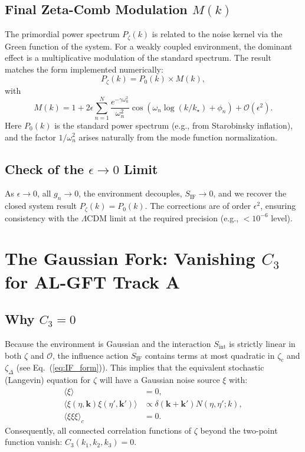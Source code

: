 \documentclass[12pt]{article}
\begin{document}
\subsection{Final Zeta-Comb Modulation $M(k)$}
The primordial power spectrum $P_\zeta(k)$ is related to the noise kernel via the Green function of the system. For a weakly coupled environment, the dominant effect is a multiplicative modulation of the standard spectrum. The result matches the form implemented numerically:
\begin{equation}
P_\zeta(k) = P_0(k) \times M(k),
\label{eq:Pzeta_final}
\end{equation}
with
\begin{equation}
M(k) = 1 + 2\epsilon \sum_{n=1}^{N} \frac{e^{-\gamma \omega_n^2}}{\omega_n^2} \cos\left(\omega_n \log(k/k_\star) + \phi_n\right) + \mathcal{O}(\epsilon^2).
\label{eq:Mk_final}
\end{equation}
Here $P_0(k)$ is the standard power spectrum (e.g., from Starobinsky inflation), and the factor $1/\omega_n^2$ arises naturally from the mode function normalization.

\subsection{Check of the $\epsilon \to 0$ Limit}
As $\epsilon \to 0$, all $g_n \to 0$, the environment decouples, $S_{\text{IF}} \to 0$, and we recover the closed system result $P_\zeta(k) = P_0(k)$. The corrections are of order $\epsilon^2$, ensuring consistency with the $\Lambda$CDM limit at the required precision (e.g., $< 10^{-6}$ level).

\section{The Gaussian Fork: Vanishing $C_3$ for AL-GFT Track A}

\subsection{Why $C_3 = 0$}
Because the environment is Gaussian and the interaction $S_{\text{int}}$ is strictly linear in both $\zeta$ and $\mathcal{O}$, the influence action $S_{\text{IF}}$ contains terms at most quadratic in $\zeta_c$ and $\zeta_\Delta$ (see Eq.~(\ref{eq:IF_form})). This implies that the equivalent stochastic (Langevin) equation for $\zeta$ will have a Gaussian noise source $\xi$ with:
\begin{align}
\langle \xi \rangle &= 0, \\
\langle \xi(\eta,\bm{k}) \xi(\eta',\bm{k}') \rangle &\propto \delta(\bm{k}+\bm{k}') N(\eta,\eta';k), \\
\langle \xi \xi \xi \rangle_c &= 0.
\end{align}
Consequently, all connected correlation functions of $\zeta$ beyond the two-point function vanish: $C_3(k_1,k_2,k_3) = 0$.
\end{document}
